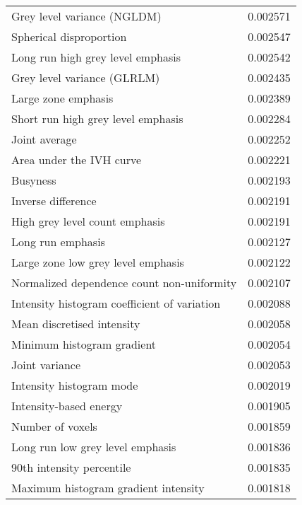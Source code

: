 \begin{tabular}{lr}
Grey level variance (NGLDM)                        &        0.002571 \\
Spherical disproportion                            &        0.002547 \\
Long run high grey level emphasis                  &        0.002542 \\
Grey level variance (GLRLM)                        &        0.002435 \\
Large zone emphasis                                &        0.002389 \\
Short run high grey level emphasis                 &        0.002284 \\
Joint average                                      &        0.002252 \\
Area under the IVH curve                           &        0.002221 \\
Busyness                                           &        0.002193 \\
Inverse difference                                 &        0.002191 \\
High grey level count emphasis                     &        0.002191 \\
Long run emphasis                                  &        0.002127 \\
Large zone low grey level emphasis                 &        0.002122 \\
Normalized dependence count non-uniformity         &        0.002107 \\
Intensity histogram coefficient of variation       &        0.002088 \\
Mean discretised intensity                         &        0.002058 \\
Minimum histogram gradient                         &        0.002054 \\
Joint variance                                     &        0.002053 \\
Intensity histogram mode                           &        0.002019 \\
Intensity-based energy                             &        0.001905 \\
Number of voxels                                   &        0.001859 \\
Long run low grey level emphasis                   &        0.001836 \\
90th intensity percentile                          &        0.001835 \\
Maximum histogram gradient intensity               &        0.001818 \\

\end{tabular}
